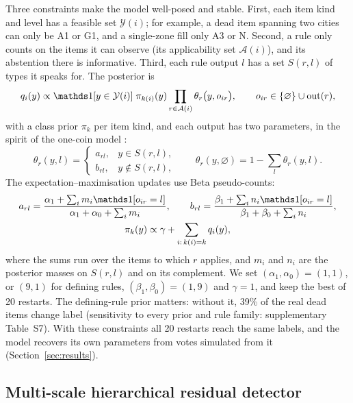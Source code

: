 Three constraints make the model well-posed and stable. First, each item kind and level has a feasible set $\mathcal{Y}(i)$; for example, a dead item spanning two cities can only be A1 or G1, and a single-zone fill only A3 or N. Second, a rule only counts on the items it can observe (its applicability set $\mathcal{A}(i)$), and its abstention there is informative. Third, each rule output $l$ has a set $S(r, l)$ of types it speaks for. The posterior is
\begin{equation}
q_i(y) \propto \one[y \in \mathcal{Y}(i)]\; \pi_{k(i)}(y) \prod_{r \in \mathcal{A}(i)} \theta_r\big(y, o_{ir}\big), \qquad o_{ir} \in \{\varnothing\} \cup \mathrm{out}(r),
\label{eq:lm}
\end{equation}
with a class prior $\pi_k$ per item kind, and each output has two parameters, in the spirit of the one-coin model \cite{zhang2016spectral}:
\begin{equation}
\theta_r(y, l) = \begin{cases} a_{rl}, & y \in S(r,l), \\ b_{rl}, & y \notin S(r,l), \end{cases} \qquad \theta_r(y, \varnothing) = 1 - \sum_{l} \theta_r(y, l).
\label{eq:onecoin}
\end{equation}
The expectation--maximisation updates use Beta pseudo-counts:
\begin{equation}
\begin{gathered}
a_{rl} = \frac{\alpha_1 + \sum_i m_{i} \one[o_{ir} = l]}{\alpha_1 + \alpha_0 + \sum_i m_{i}}, \qquad
b_{rl} = \frac{\beta_1 + \sum_i n_{i} \one[o_{ir} = l]}{\beta_1 + \beta_0 + \sum_i n_{i}}, \\
\pi_k(y) \propto \gamma + \sum_{i:\, k(i) = k} q_i(y),
\end{gathered}
\label{eq:mstep}
\end{equation}
where the sums run over the items to which $r$ applies, and $m_i$ and $n_i$ are the posterior masses on $S(r,l)$ and on its complement. We set $(\alpha_1, \alpha_0) = (1, 1)$, or $(9, 1)$ for defining rules, $(\beta_1, \beta_0) = (1, 9)$ and $\gamma = 1$, and keep the best of 20 restarts. The defining-rule prior matters: without it, 39\% of the real dead items change label (sensitivity to every prior and rule family: supplementary Table~S7). With these constraints all 20 restarts reach the same labels, and the model recovers its own parameters from votes simulated from it (Section~\ref{sec:results}). %

\subsection{Multi-scale hierarchical residual detector}\label{sec:detector}

